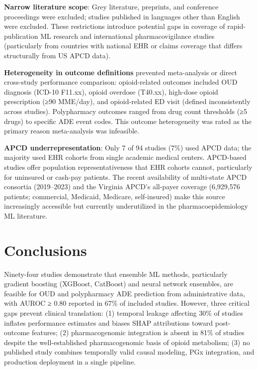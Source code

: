 \documentclass[
  12pt,
]{book}
\begin{document}
\textbf{Narrow literature scope}: Grey literature, preprints, and
conference proceedings were excluded; studies published in languages
other than English were excluded. These restrictions introduce potential
gaps in coverage of rapid-publication ML research and international
pharmacovigilance studies (particularly from countries with national EHR
or claims coverage that differs structurally from US APCD data).

\textbf{Heterogeneity in outcome definitions} prevented meta-analysis or
direct cross-study performance comparison: opioid-related outcomes
included OUD diagnosis (ICD-10 F11.xx), opioid overdose (T40.xx),
high-dose opioid prescription (≥90 MME/day), and opioid-related ED visit
(defined inconsistently across studies). Polypharmacy outcomes ranged
from drug count thresholds (≥5 drugs) to specific ADE event codes. This
outcome heterogeneity was rated as the primary reason meta-analysis was
infeasible.

\textbf{APCD underrepresentation}: Only 7 of 94 studies (7\%) used APCD
data; the majority used EHR cohorts from single academic medical
centers. APCD-based studies offer population representativeness that EHR
cohorts cannot, particularly for uninsured or cash-pay patients. The
recent availability of multi-state APCD consortia (2019--2023) and the
Virginia APCD's all-payer coverage (6,929,576 patients; commercial,
Medicaid, Medicare, self-insured) make this source increasingly
accessible but currently underutilized in the pharmacoepidemiology ML
literature.

\chapter{Conclusions}\label{sec-conclusions}

Ninety-four studies demonstrate that ensemble ML methods, particularly
gradient boosting (XGBoost, CatBoost) and neural network ensembles, are
feasible for OUD and polypharmacy ADE prediction from administrative
data, with AUROC ≥ 0.80 reported in 67\% of included studies. However,
three critical gaps prevent clinical translation: (1) temporal leakage
affecting 30\% of studies inflates performance estimates and biases SHAP
attributions toward post-outcome features; (2) pharmacogenomic
integration is absent in 81\% of studies despite the well-established
pharmacogenomic basis of opioid metabolism; (3) no published study
combines temporally valid causal modeling, PGx integration, and
production deployment in a single pipeline.
\end{document}
